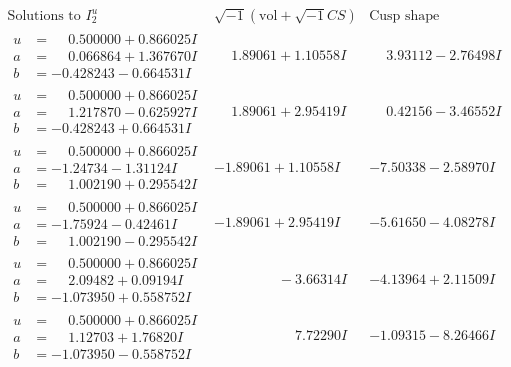 \documentclass[1p]{elsarticle_modified}
\theoremstyle{definition}
\newcommand{\I}{\sqrt{-1}}
\begin{document}
$$\begin{array}{c|c|c}  
\text{Solutions to }I^u_{2}& \I (\text{vol} + \sqrt{-1}CS) & \text{Cusp shape}\\
 \hline 
\begin{aligned}
u &= \phantom{-}0.500000 + 0.866025 I \\
a &= \phantom{-}0.066864 + 1.367670 I \\
b &= -0.428243 - 0.664531 I\end{aligned}
 & \phantom{-}1.89061 + 1.10558 I & \phantom{-}3.93112 - 2.76498 I \\ \hline\begin{aligned}
u &= \phantom{-}0.500000 + 0.866025 I \\
a &= \phantom{-}1.217870 - 0.625927 I \\
b &= -0.428243 + 0.664531 I\end{aligned}
 & \phantom{-}1.89061 + 2.95419 I & \phantom{-}0.42156 - 3.46552 I \\ \hline\begin{aligned}
u &= \phantom{-}0.500000 + 0.866025 I \\
a &= -1.24734 - 1.31124 I \\
b &= \phantom{-}1.002190 + 0.295542 I\end{aligned}
 & -1.89061 + 1.10558 I & -7.50338 - 2.58970 I \\ \hline\begin{aligned}
u &= \phantom{-}0.500000 + 0.866025 I \\
a &= -1.75924 - 0.42461 I \\
b &= \phantom{-}1.002190 - 0.295542 I\end{aligned}
 & -1.89061 + 2.95419 I & -5.61650 - 4.08278 I \\ \hline\begin{aligned}
u &= \phantom{-}0.500000 + 0.866025 I \\
a &= \phantom{-}2.09482 + 0.09194 I \\
b &= -1.073950 + 0.558752 I\end{aligned}
 & \phantom{-0.000000 } -3.66314 I & -4.13964 + 2.11509 I \\ \hline\begin{aligned}
u &= \phantom{-}0.500000 + 0.866025 I \\
a &= \phantom{-}1.12703 + 1.76820 I \\
b &= -1.073950 - 0.558752 I\end{aligned}
 & \phantom{-0.000000 -}7.72290 I & -1.09315 - 8.26466 I \\ \hline\begin{aligned}

\end{aligned}
\end{array}$$
\end{document}
